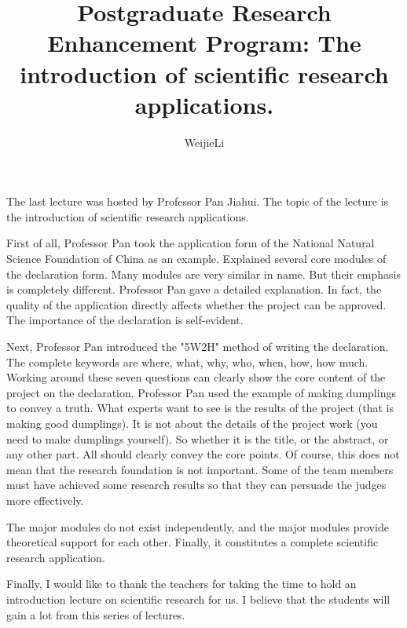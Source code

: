 \documentclass[prodmode,acmtap]{acmlarge}
\title{Postgraduate Research Enhancement Program: The introduction of scientific research applications.}
\author{WeijieLi \affil{South China Normal University}}
\begin{document}
\maketitle

The last lecture was hosted by Professor Pan Jiahui. The topic of the lecture is the introduction of scientific research applications.

First of all, Professor Pan took the application form of the National Natural Science Foundation of China as an example. Explained several core modules of the declaration form. Many modules are very similar in name. But their emphasis is completely different. Professor Pan gave a detailed explanation. In fact, the quality of the application directly affects whether the project can be approved. The importance of the declaration is self-evident.


Next, Professor Pan introduced the "5W2H" method of writing the declaration. The complete keywords are where, what, why, who, when, how, how much. Working around these seven questions can clearly show the core content of the project on the declaration. Professor Pan used the example of making dumplings to convey a truth. What experts want to see is the results of the project (that is making good dumplings). It is not about the details of the project work (you need to make dumplings yourself). So whether it is the title, or the abstract, or any other part. All should clearly convey the core points. Of course, this does not mean that the research foundation is not important. Some of the team members must have achieved some research results so that they can persuade the judges more effectively.

The major modules do not exist independently, and the major modules provide theoretical support for each other. Finally, it constitutes a complete scientific research application. 

Finally, I would like to thank the teachers for taking the time to hold an introduction lecture on scientific research for us. I believe that the students will gain a lot from this series of lectures. 
\end{document}

